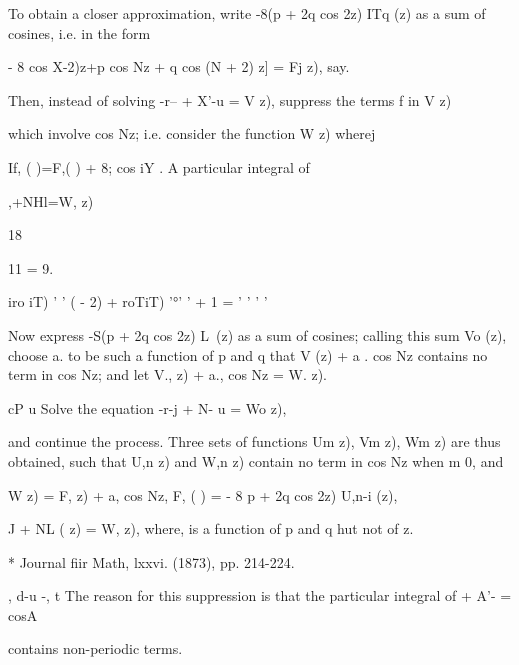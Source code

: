 To obtain a closer approximation, write -8(p + 2q cos 2z) ITq (z) as a
sum of cosines, i.e. in the form

- 8 cos X-2)z+p cos Nz + q cos (N + 2) z] = Fj z), say.

Then, instead of solving -r-- + X'-u = V z), suppress the terms f in V
z)

which involve cos Nz; i.e. consider the function W z) wherej

If, ( )=F,( ) + 8; cos iY . A particular integral of

,+NHl=W, z)

18

11 = 9.

iro iT) ' ' ( - 2) + roTiT) '°' ' + 1 = ' ' ' '

Now express -S(p + 2q cos 2z) L\ (z) as a sum of cosines; calling
this sum Vo (z), choose a. to be such a function of p and q that V (z)
+ a . cos Nz contains no term in cos Nz; and let V., z) + a., cos Nz
= W. z).

cP u Solve the equation -r-j + N- u = Wo z),

and continue the process. Three sets of functions Um z), Vm z), Wm z)
are thus obtained, such that U,n z) and W,n z) contain no term in cos
Nz when m 0, and

W z) = F, z) + a, cos Nz, F, ( ) = - 8 p + 2q cos 2z) U,n-i (z),

 J + NL ( z) = W, z), where, is a function of p and q hut not of z.

* Journal fiir Math, lxxvi. (1873), pp. 214-224.

, d-u -, t The reason for this suppression is that the particular
integral of + A'- = cosA

contains non-periodic terms.

